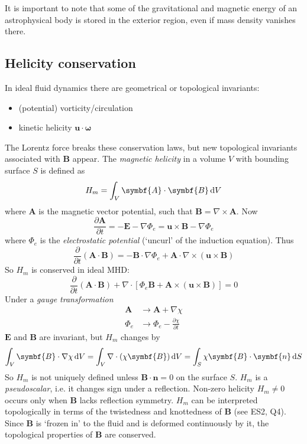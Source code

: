 \documentclass{jknotes}
\newcommand{\B}{\symbf{B}}
\renewcommand{\u}{\symbf{u}}
\begin{document}
It is important to note that some of the gravitational and magnetic energy of
an astrophysical body is stored in the exterior region, even if mass density
vanishes there.

\subsection{Helicity conservation}
In ideal fluid dynamics there are geometrical or topological invariants:
\begin{itemize}
	\item (potential) vorticity/circulation
	\item kinetic helicity $\u \cdot \symbf{\omega}$
\end{itemize}

The Lorentz force breaks these conservation laws, but new topological
invariants associated with $\B$ appear. The \emph{magnetic helicity} in a
volume $V$ with bounding surface $S$ is defined as
\begin{equation}
	H_m = \int_V \symbf{A} \cdot \B \, \diffd V
\end{equation}
where $\symbf{A}$ is the magnetic vector potential, such that $\B = \nabla
\times \symbf{A}$. Now
\begin{equation}
	\frac{\partial \symbf{A}}{\partial t} = - \symbf{E} - \nabla \Phi_e = \u
	\times \B - \nabla \Phi_e
\end{equation}
where $\Phi_e$ is the \emph{electrostatic potential} (`uncurl' of the
induction equation). Thus
\begin{equation}
	\frac{\partial}{\partial t}(\symbf{A} \cdot \B) = - \B \cdot \nabla \Phi_e
	+ \symbf{A} \cdot \nabla \times (\u \times \B)
\end{equation}
So $H_m$ is conserved in ideal MHD:
\begin{equation}
	\frac{\partial}{\partial t}(\symbf{A} \cdot \B) + \nabla \cdot \left[
	\Phi_e \B + \symbf{A} \times (\u \times \B) \right] = 0
\end{equation}
Under a \emph{gauge transformation}
\begin{align}
	\symbf{A} &\to \symbf{A} + \nabla \chi \\
	\Phi_e &\to \Phi_e - \frac{\partial \chi}{\partial t}
\end{align}
$\symbf{E}$ and $\B$ are invariant, but $H_m$ changes by
\begin{equation}
	\int_V \B \cdot \nabla \chi \, \diffd V = \int_V \nabla \cdot (\chi \B)
	\, \diffd V = \int_S \chi \B \cdot \symbf{n} \, \diffd S
\end{equation}
So $H_m$ is not uniquely defined unless $\B\cdot\symbf{n} = 0$ on the surface
$S$. $H_m$ is a \emph{pseudoscalar}, i.e. it changes sign under a reflection.
Non-zero helicity $H_m \ne 0$ occurs only when $\B$ lacks reflection symmetry.
$H_m$ can be interpreted topologically in terms of the twistedness and
knottedness of $\B$ (see ES2, Q4). Since $\B$ is `frozen in' to the fluid and
is deformed continuously by it, the topological properties of $\B$ are
conserved.
\end{document}
